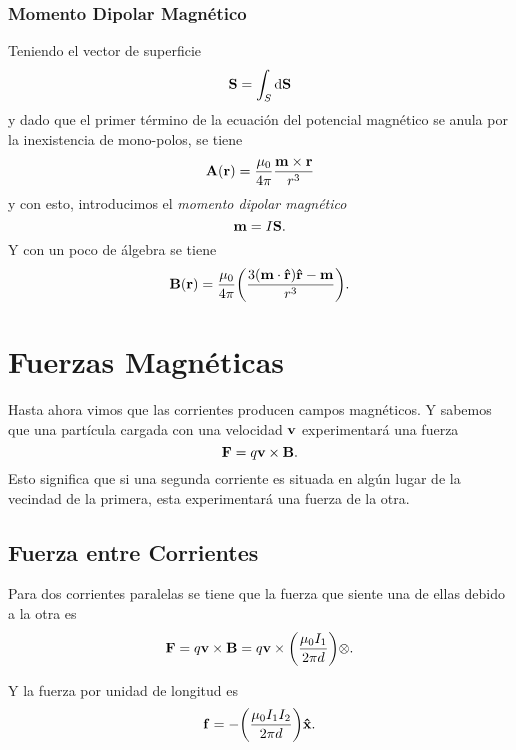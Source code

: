 \subsubsection{Momento Dipolar Magnético}
Teniendo el vector de superficie
\begin{equation}
    \mathcal{\mathbf{S}} = \int _S \dd{\vb{S}}
\end{equation}
y dado que el primer término de la ecuación del potencial magnético se anula por la inexistencia de mono-polos, se tiene
\begin{equation}
    \vb{A} (\vb{r}) = \frac{\mu_0}{4\pi} \frac{\vb{m} \times \vb{r}}{r^3}
\end{equation}
y con esto, introducimos el \textit{momento dipolar magnético} 
\begin{equation}
    \vb{m} = I\mathcal{\mathbf{S}}.
\end{equation}
Y con un poco de álgebra se tiene
\begin{equation}
    \vb{B} (\vb{r}) = \frac{\mu_0}{4\pi} \qty(\frac{3(\vb{m} \cdot \vu{r}) \vu{r} - \vb{m}}{r^3}).
\end{equation}


\section{Fuerzas Magnéticas}
Hasta ahora vimos que las corrientes producen campos magnéticos. Y sabemos que una partícula cargada con una velocidad $\vb{v}$ experimentará una fuerza
\begin{equation}
    \vb{F} = q\vb{v} \times \vb{B}.
\end{equation}
Esto significa que si una segunda corriente es situada en algún lugar de la vecindad de la primera, esta experimentará una fuerza de la otra.

\subsection{Fuerza entre Corrientes}
Para dos corrientes paralelas se tiene que la fuerza que siente una de ellas debido a la otra es
\begin{equation}
    \vb{F} = q\vb{v} \times \vb{B} = q\vb{v} \times \qty(\frac{\mu_0 I_1}{2\pi d}) \mathbf{\otimes}.
\end{equation}

Y la fuerza por unidad de longitud es
\begin{equation}
    \vb{f} = -\qty(\frac{\mu_0 I_1 I_2}{2\pi d}) \vu{x}.
\end{equation}


